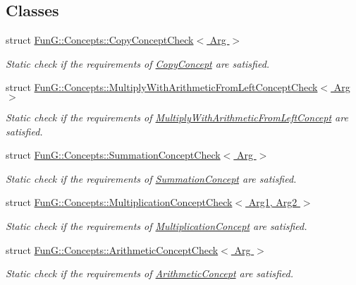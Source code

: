 \subsection*{Classes}
\begin{DoxyCompactItemize}
\item 
struct \hyperlink{structFunG_1_1Concepts_1_1CopyConceptCheck}{Fun\-G\-::\-Concepts\-::\-Copy\-Concept\-Check$<$ Arg $>$}
\begin{DoxyCompactList}\small\item\em Static check if the requirements of \hyperlink{structFunG_1_1Concepts_1_1CopyConcept}{Copy\-Concept} are satisfied. \end{DoxyCompactList}\item 
struct \hyperlink{structFunG_1_1Concepts_1_1MultiplyWithArithmeticFromLeftConceptCheck}{Fun\-G\-::\-Concepts\-::\-Multiply\-With\-Arithmetic\-From\-Left\-Concept\-Check$<$ Arg $>$}
\begin{DoxyCompactList}\small\item\em Static check if the requirements of \hyperlink{structFunG_1_1Concepts_1_1MultiplyWithArithmeticFromLeftConcept}{Multiply\-With\-Arithmetic\-From\-Left\-Concept} are satisfied. \end{DoxyCompactList}\item 
struct \hyperlink{structFunG_1_1Concepts_1_1SummationConceptCheck}{Fun\-G\-::\-Concepts\-::\-Summation\-Concept\-Check$<$ Arg $>$}
\begin{DoxyCompactList}\small\item\em Static check if the requirements of \hyperlink{structFunG_1_1Concepts_1_1SummationConcept}{Summation\-Concept} are satisfied. \end{DoxyCompactList}\item 
struct \hyperlink{structFunG_1_1Concepts_1_1MultiplicationConceptCheck}{Fun\-G\-::\-Concepts\-::\-Multiplication\-Concept\-Check$<$ Arg1, Arg2 $>$}
\begin{DoxyCompactList}\small\item\em Static check if the requirements of \hyperlink{structFunG_1_1Concepts_1_1MultiplicationConcept}{Multiplication\-Concept} are satisfied. \end{DoxyCompactList}\item 
struct \hyperlink{structFunG_1_1Concepts_1_1ArithmeticConceptCheck}{Fun\-G\-::\-Concepts\-::\-Arithmetic\-Concept\-Check$<$ Arg $>$}
\begin{DoxyCompactList}\small\item\em Static check if the requirements of \hyperlink{structFunG_1_1Concepts_1_1ArithmeticConcept}{Arithmetic\-Concept} are satisfied. \end{DoxyCompactList}\item 

\end{DoxyCompactItemize}
